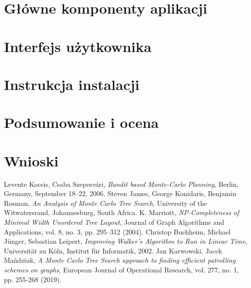 \documentclass[a4paper,11pt,twoside]{report}
\theoremstyle{definition}
\begin{document}
\chapter{Główne komponenty aplikacji}


\chapter{Interfejs użytkownika}


\chapter{Instrukcja instalacji}


\chapter{Podsumowanie i ocena}


\chapter{Wnioski}



\begin{thebibliography}{20}%
 Levente Kocsis, Csaba Szepesvári, \emph{Bandit based Monte-Carlo Planning}, Berlin, Germany, September 18--22, 2006.
 Steven James, George Konidaris, Benjamin Rosman, \emph{An Analysis of Monte Carlo Tree Search}, University of the Witwatersrand, Johannesburg, South Africa.
 K. Marriott, \emph{NP-Completeness of Minimal Width Unordered Tree Layout}, Journal of Graph Algorithms and Applications, vol. 8, no. 3, pp. 295--312 (2004).
 Christop Buchheim, Michael Jünger, Sebastian Leipert, \emph{Improving Walker's Algorithm to Run in Linear Time}, Universität zu Köln, Institut für Informatik, 2002.
 Jan Karwowski, Jacek Mańdziuk, \emph{A Monte Carlo Tree Search approach to finding efficient patrolling schemes on graphs}, European Journal of Operational Research, vol. 277, no. 1, pp. 255-268 (2019).
\end{thebibliography}
\end{document}
